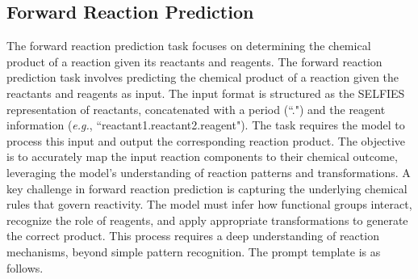 \subsection{Forward Reaction Prediction}
The forward reaction prediction task focuses on determining the chemical product of a reaction given its reactants and reagents. The forward reaction prediction task involves predicting the chemical product of a reaction given the reactants and reagents as input. The input format is structured as the SELFIES representation of reactants, concatenated with a period (``.") and the reagent information (\emph{e.g.}, ``reactant1.reactant2.reagent"). The task requires the model to process this input and output the corresponding reaction product. The objective is to accurately map the input reaction components to their chemical outcome, leveraging the model’s understanding of reaction patterns and transformations. A key challenge in forward reaction prediction is capturing the underlying chemical rules that govern reactivity. The model must infer how functional groups interact, recognize the role of reagents, and apply appropriate transformations to generate the correct product. This process requires a deep understanding of reaction mechanisms, beyond simple pattern recognition. The prompt template is as follows.

